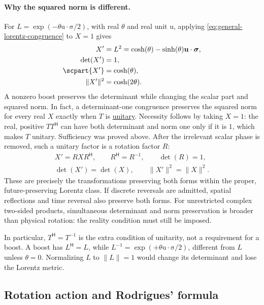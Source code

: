 \documentclass[11pt]{article}
\newcommand{\pv}[1]{{#1}}
\newcommand{\vstyle}[1]{{\bm{\mathrm{#1}}}}
\newcommand{\pL}{\pv{L}}
\newcommand{\pR}{\pv{R}}
\newcommand{\pT}{\pv{T}}
\newcommand{\pX}{\pv{X}}
\numberwithin{equation}{section}
\newcommand{\dotprod}{\cdot}
\newcommand{\bsig}{\vstyle{\sigma}}
\newcommand{\bu}{\vstyle{u}}
\begin{document}
\paragraph{Why the squared norm is different.}
For $\pL=\exp(-\theta\bu\dotprod\bsig/2)$, with real $\theta$ and real unit
$\bu$, applying \eqref{eq:general-lorentz-congruence} to $\pX=1$ gives
\begin{align*}
 \pX'&=\pL^2=\cosh(\theta)-\sinh(\theta)\bu\dotprod\bsig,\\
 \det(\pX')&=1,\\
 \scpart{\pX'}&=\cosh(\theta),\\
 \lVert \pX'\rVert^2&=\cosh(2\theta).
\end{align*}
A nonzero boost preserves the determinant while changing the scalar part
and squared norm.  In fact, a determinant-one congruence preserves the
squared norm for every real $\pX$ exactly when $\pT$ is
\hyperref[eq:unitary-transform]{unitary}.  Necessity follows by taking
$\pX=1$: the real, positive $\pT \pT^{\mathsf H}$ can have both determinant and
norm one only if it is $1$, which makes $\pT$ unitary.  Sufficiency was proved above.
After the irrelevant scalar phase is removed, such a unitary factor
is a rotation factor $\pR$:
\[
 \boxed{\begin{gathered}
 \pX'=\pR\pX\pR^{\mathsf H},\qquad
 \pR^{\mathsf H}=\pR^{-1},\qquad \det(\pR)=1,\\
 \det(\pX')=\det(\pX),\qquad
 \lVert\pX'\rVert^2=\lVert\pX\rVert^2 .
 \end{gathered}}
\]
These are precisely the transformations preserving both forms within
the proper, future-preserving Lorentz class. If discrete reversals
are admitted, spatial reflections and time reversal also preserve
both forms. For unrestricted complex two-sided products, simultaneous
determinant and norm preservation is broader than physical rotation:
the reality condition must still be imposed.

In particular, $\pT^{\mathsf H}=\pT^{-1}$ is the extra condition of
unitarity, not a requirement for a boost. A boost has
$\pL^{\mathsf H}=\pL$, while
$\pL^{-1}=\exp(+\theta\bu\dotprod\bsig/2)$, different from $\pL$
unless $\theta=0$. Normalizing $\pL$ to
$\lVert\pL\rVert=1$ would change its determinant and lose the Lorentz metric.

\subsection{Rotation action and Rodrigues' formula}
\label{sec:algebra-rotation-action}
\end{document}
